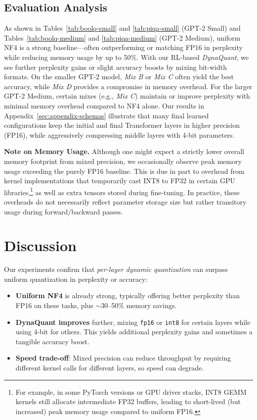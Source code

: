 \documentclass{article}
\begin{document}
	\subsection{Evaluation Analysis}
	
	As shown in Tables~\ref{tab:boolq-small} and \ref{tab:piqa-small} (GPT-2 Small) and Tables~\ref{tab:boolq-medium} and \ref{tab:piqa-medium} (GPT-2 Medium), uniform NF4 is a strong baseline—often outperforming or matching FP16 in perplexity while reducing memory usage by up to 50\%. With our RL-based \emph{DynaQuant}, we see further perplexity gains or slight accuracy boosts by mixing bit-width formats. On the smaller GPT-2 model, \emph{Mix B} or \emph{Mix C} often yield the best accuracy, while \emph{Mix D} provides a compromise in memory overhead. For the larger GPT-2 Medium, certain mixes (e.g., \emph{Mix C}) maintain or improve perplexity with minimal memory overhead compared to NF4 alone. Our results in Appendix~\ref{sec:appendix-schemas} illustrate that many final learned configurations keep the initial and final Transformer layers in higher precision (FP16), while aggressively compressing middle layers with 4-bit parameters.
	
	\textbf{Note on Memory Usage.} Although one might expect a strictly lower overall memory footprint from mixed precision, we occasionally observe peak memory usage exceeding the purely FP16 baseline. This is due in part to overhead from kernel implementations that temporarily cast INT8 to FP32 in certain GPU libraries,\footnote{ For example, in some PyTorch versions or GPU driver stacks, INT8 GEMM kernels still allocate intermediate FP32 buffers, leading to short-lived (but increased) peak memory usage compared to uniform FP16.} as well as extra tensors stored during fine-tuning. In practice, these overheads do not necessarily reflect parameter storage size but rather transitory usage during forward/backward passes.
	
	\section{Discussion}
	\label{sec:discussion}
	
	Our experiments confirm that \emph{per-layer dynamic quantization} can surpass uniform quantization in perplexity or accuracy:
	
	\begin{itemize}
		\item \textbf{Uniform NF4} is already strong, typically offering better perplexity than FP16 on these tasks, plus $\sim$30--50\% memory savings.
		\item \textbf{DynaQuant improves} further, mixing \texttt{fp16} or \texttt{int8} for certain layers while using 4-bit for others. This yields additional perplexity gains and sometimes a tangible accuracy boost.
		\item \textbf{Speed trade-off}: Mixed precision can reduce throughput by requiring different kernel calls for different layers, so speed can degrade.
	\end{itemize}
	
\end{document}
